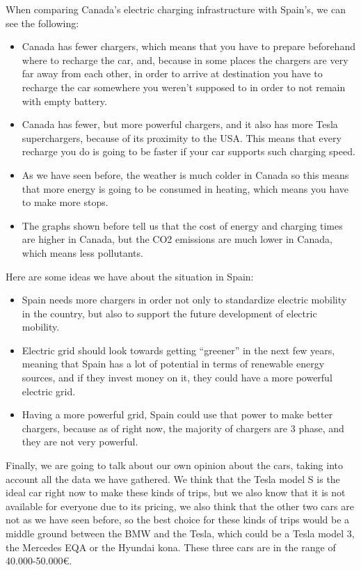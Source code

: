 \documentclass{article}
\begin{document}
When comparing Canada’s electric charging infrastructure with Spain’s, we can see the following:
\begin{itemize}
\item Canada has fewer chargers, which means that you have to prepare beforehand where to recharge the car, and, because in some places the chargers are very far away from each other, in order to arrive at destination you have to recharge the car somewhere you weren’t supposed to in order to not remain with empty battery.
\item Canada has fewer, but more powerful chargers, and it also has more Tesla superchargers, because of its proximity to the USA. This means that every recharge you do is going to be faster if your car supports such charging speed. 
\item As we have seen before, the weather is much colder in Canada so this means that more energy is going to be consumed in heating, which means you have to make more stops.
\item The graphs shown before tell us that the cost of energy and charging times  are higher in Canada, but the CO2 emissions are much lower in Canada, which means less pollutants.
\end{itemize}

Here are some ideas we have about the situation in Spain:
\begin{itemize}

\item Spain needs more chargers in order not only to standardize electric mobility in the country, but also to support the future development of electric mobility.
\item Electric grid should look towards getting “greener” in the next few years, meaning that Spain has a lot of potential in terms of renewable energy sources, and if they invest money on it, they could have a more powerful electric grid.
\item Having a more powerful grid, Spain could use that power to make better chargers, because as of right now, the majority of chargers are 3 phase, and they are not very powerful.
\end{itemize}

Finally, we are going to talk about our own opinion about the cars, taking into account all the data we have gathered. We think that the Tesla model S is the ideal car right now to make these kinds of trips, but we also know that it is not available for everyone due to its pricing, we also think that the other two cars are not as we have seen before, so the best choice for these kinds of trips would be a middle ground between the BMW and the Tesla, which could be a Tesla model 3, the Mercedes EQA or the Hyundai kona. These three cars are in the range of 40.000-50.000€. 
\end{document}
